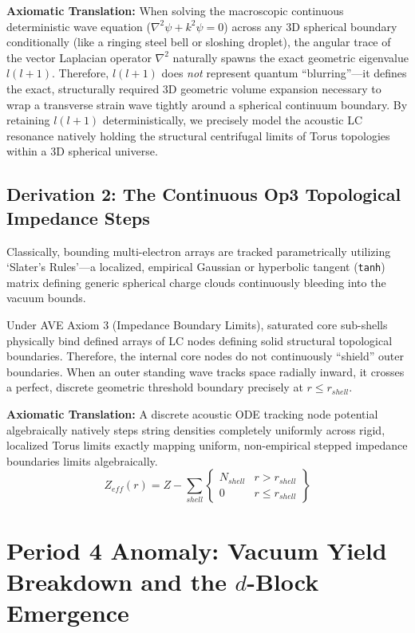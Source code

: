 \textbf{Axiomatic Translation:} When solving the macroscopic continuous deterministic wave equation ($\nabla^2 \psi + k^2 \psi = 0$) across any 3D spherical boundary conditionally (like a ringing steel bell or sloshing droplet), the angular trace of the vector Laplacian operator $\nabla^2$ naturally spawns the exact geometric eigenvalue $l(l+1)$. Therefore, $l(l+1)$ does \textit{not} represent quantum ``blurring''—it defines the exact, structurally required 3D geometric volume expansion necessary to wrap a transverse strain wave tightly around a spherical continuum boundary. By retaining $l(l+1)$ deterministically, we precisely model the acoustic LC resonance natively holding the structural centrifugal limits of Torus topologies within a 3D spherical universe.

\subsection{Derivation 2: The Continuous Op3 Topological Impedance Steps}
Classically, bounding multi-electron arrays are tracked parametrically utilizing `Slater's Rules'—a localized, empirical Gaussian or hyperbolic tangent (\texttt{tanh}) matrix defining generic spherical charge clouds continuously bleeding into the vacuum bounds. 

Under AVE Axiom 3 (Impedance Boundary Limits), saturated core sub-shells physically bind defined arrays of LC nodes defining solid structural topological boundaries. Therefore, the internal core nodes do not continuously ``shield'' outer boundaries. When an outer standing wave tracks space radially inward, it crosses a perfect, discrete geometric threshold boundary precisely at $r \le r_{shell}$. 

\textbf{Axiomatic Translation:} A discrete acoustic ODE tracking node potential algebraically natively steps string densities completely uniformly across rigid, localized Torus limits exactly mapping uniform, non-empirical stepped impedance boundaries limits algebraically.
\begin{equation}
    Z_{eff}(r) = Z - \sum_{shell} \left\{ \begin{matrix} N_{shell} & r > r_{shell} \\ 0 & r \le r_{shell} \end{matrix} \right\}
\end{equation}

\section{Period 4 Anomaly: Vacuum Yield Breakdown and the $d$-Block Emergence}
\label{sec:period_4_anomaly}

